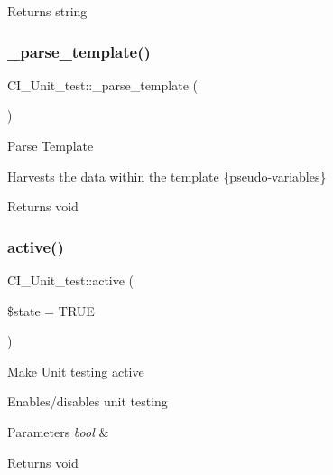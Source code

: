 \begin{DoxyReturn}{Returns}
string 
\end{DoxyReturn}
\mbox{\label{class_c_i___unit__test_a0c7c0f5edc7aa493762e58af1563a3d3}} 
\subsubsection{\texorpdfstring{\+\_\+parse\+\_\+template()}{\_parse\_template()}}
{\footnotesize\ttfamily C\+I\+\_\+\+Unit\+\_\+test\+::\+\_\+parse\+\_\+template (\begin{DoxyParamCaption}{ }\end{DoxyParamCaption})\hspace{0.3cm}{\ttfamily [protected]}}

Parse Template

Harvests the data within the template \{pseudo-\/variables\}

\begin{DoxyReturn}{Returns}
void 
\end{DoxyReturn}
\mbox{\label{class_c_i___unit__test_ae38eaa1f6b4bb147adf2c9722cff9b05}} 
\subsubsection{\texorpdfstring{active()}{active()}}
{\footnotesize\ttfamily C\+I\+\_\+\+Unit\+\_\+test\+::active (\begin{DoxyParamCaption}\item[{}]{\$state = {\ttfamily TRUE} }\end{DoxyParamCaption})}

Make Unit testing active

Enables/disables unit testing


\begin{DoxyParams}{Parameters}
{\em bool} & \\
\hline
\end{DoxyParams}
\begin{DoxyReturn}{Returns}
void 
\end{DoxyReturn}
\mbox{\label{class_c_i___unit__test_a665957133851ee9dfa906539a3d2f5ea}} 
